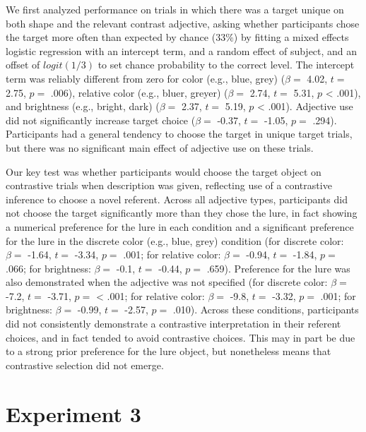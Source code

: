 \documentclass[10pt, letterpaper]{article}
\begin{document}
We first analyzed performance on trials in which there was a target
unique on both shape and the relevant contrast adjective, asking whether
participants chose the target more often than expected by chance
(\(33\%\)) by fitting a mixed effects logistic regression with an
intercept term, and a random effect of subject, and an offset of
\(logit(1/3)\) to set chance probability to the correct level. The
intercept term was reliably different from zero for color (e.g., blue,
grey) (\(\beta =\) 4.02, \(t =\) 2.75, \(p =\) .006), relative color
(e.g., bluer, greyer) (\(\beta =\) 2.74, \(t =\) 5.31, \(p\) \textless{}
.001), and brightness (e.g., bright, dark) (\(\beta =\) 2.37, \(t =\)
5.19, \(p\) \textless{} .001). Adjective use did not significantly
increase target choice (\(\beta =\) -0.37, \(t =\) -1.05, \(p =\) .294).
Participants had a general tendency to choose the target in unique
target trials, but there was no significant main effect of adjective use
on these trials.

Our key test was whether participants would choose the target object on
contrastive trials when description was given, reflecting use of a
contrastive inference to choose a novel referent. Across all adjective
types, participants did not choose the target significantly more than
they chose the lure, in fact showing a numerical preference for the lure
in each condition and a significant preference for the lure in the
discrete color (e.g., blue, grey) condition (for discrete color:
\(\beta =\) -1.64, \(t =\) -3.34, \(p =\) .001; for relative color:
\(\beta =\) -0.94, \(t =\) -1.84, \(p =\) .066; for brightness:
\(\beta =\) -0.1, \(t =\) -0.44, \(p =\) .659). Preference for the lure
was also demonstrated when the adjective was not specified (for discrete
color: \(\beta =\) -7.2, \(t =\) -3.71, \(p =\) \textless{} .001; for
relative color: \(\beta =\) -9.8, \(t =\) -3.32, \(p =\) .001; for
brightness: \(\beta =\) -0.99, \(t =\) -2.57, \(p =\) .010). Across
these conditions, participants did not consistently demonstrate a
contrastive interpretation in their referent choices, and in fact tended
to avoid contrastive choices. This may in part be due to a strong prior
preference for the lure object, but nonetheless means that contrastive
selection did not emerge.

\section{Experiment 3}\label{experiment-3}
\end{document}
